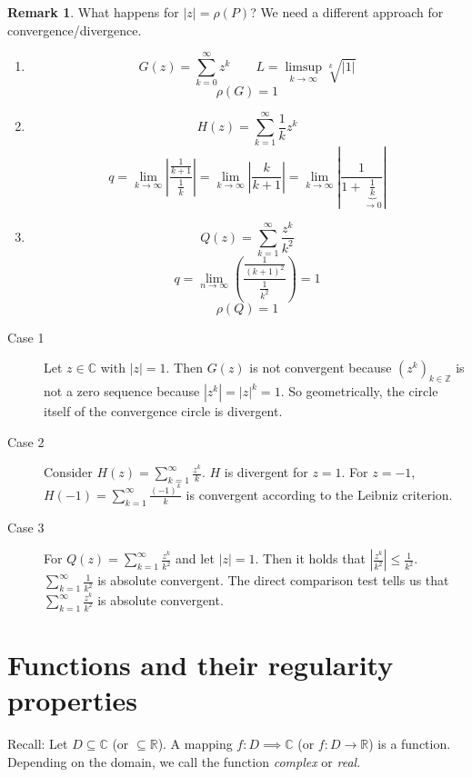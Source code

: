 \documentclass[a4paper,landscape,twocolumn]{article}
\theoremstyle{definition}
\newtheorem{rem}{Remark}
\newcommand\abs[1]{\left|#1\right|}
\begin{document}
\begin{rem}
  What happens for $\abs{z} = \rho(P)$?
  We need a different approach for convergence/divergence.
  \begin{enumerate}
    \item
      \[ G(z) = \sum_{k=0}^\infty z^k \qquad L = \limsup_{k\to\infty} \sqrt[k]{\abs{1}} \]
      \[ \rho(G) = 1 \]
    \item
      \[ H(z) = \sum_{k=1}^\infty \frac1k z^k \]
      \[
        q =
        \lim_{k\to\infty} \abs{\frac{\frac1{k+1}}{\frac1k}}
        = \lim_{k\to\infty} \abs{\frac{k}{k+1}}
        = \lim_{k\to\infty} \abs{\frac{1}{1 + \underbrace{\frac1k}_{\to0}}}
      \]
    \item
      \[ Q(z) = \sum_{k=1}^\infty \frac{z^k}{k^2} \]
      \[ q = \lim_{n\to\infty} \left(\frac{\frac{1}{(k+1)^2}}{\frac1{k^2}}\right) = 1 \]
      \[ \rho(Q) = 1 \]
  \end{enumerate}

  \begin{description}
    \item[Case 1]
      Let $z \in \mathbb C$ with $\abs{z} = 1$. Then $G(z)$ is not convergent
      because $(z^k)_{k\in\mathbb Z}$ is not a zero sequence because $\abs{z^k} = \abs{z}^k = 1$.
      So geometrically, the circle itself of the convergence circle is divergent.
    \item[Case 2]
      Consider $H(z) = \sum_{k=1}^\infty \frac{z^k}{k}$.
      $H$ is divergent for $z = 1$.
      For $z = -1$, $H(-1) = \sum_{k=1}^\infty \frac{(-1)^k}{k}$ is convergent according to the Leibniz criterion.
    \item[Case 3]
      For $Q(z) = \sum_{k=1}^\infty \frac{z^k}{k^2}$ and let $\abs{z} = 1$.
      Then it holds that $\abs{\frac{z^k}{k^2}} \leq \frac{1}{k^2}$.
      $\sum_{k=1}^\infty \frac{1}{k^2}$ is absolute convergent.
      The direct comparison test tells us that $\sum_{k=1}^\infty \frac{z^k}{k^2}$ is absolute convergent.
  \end{description}
\end{rem}

\section{Functions and their regularity properties}
%
Recall: Let $D \subseteq \mathbb C$ (or $\subseteq \mathbb R$).
A mapping $f: D \implies \mathbb C$ (or $f: D \to \mathbb R$)
is a function. Depending on the domain, we call the function \emph{complex}
or \emph{real}.
\end{document}
